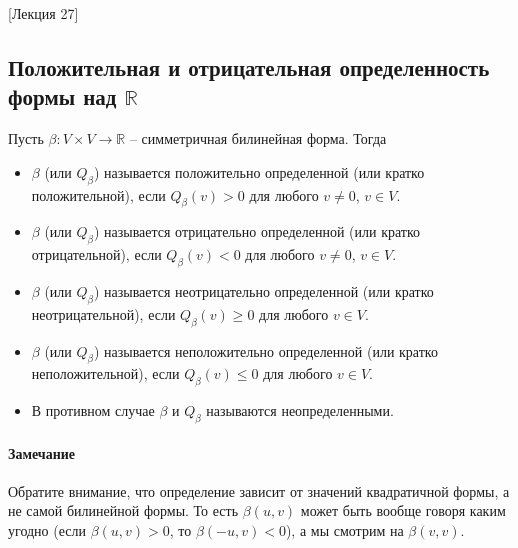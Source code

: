 [Лекция 27]


\subsection{Положительная и отрицательная определенность формы над $\mathbb R$}

\begin{definition}
Пусть $\beta\colon V\times V\to \mathbb R$ -- симметричная билинейная форма.
Тогда
\begin{itemize}
\item $\beta$ (или $Q_\beta$) называется положительно определенной (или кратко положительной), если $Q_\beta(v) > 0$ для любого $v\neq 0$, $v\in V$.

\item $\beta$ (или $Q_\beta$) называется отрицательно определенной (или кратко отрицательной), если $Q_\beta(v) < 0$ для любого $v\neq 0$, $v\in V$.

\item $\beta$ (или $Q_\beta$) называется неотрицательно определенной (или кратко неотрицательной), если $Q_\beta(v) \geqslant 0$ для любого $v\in V$.

\item $\beta$ (или $Q_\beta$) называется неположительно определенной (или кратко неположительной), если $Q_\beta(v) \leqslant 0$ для любого $v\in V$.

\item В противном случае $\beta$ и $Q_\beta$ называются неопределенными.
\end{itemize}
\end{definition}

\paragraph{Замечание}

Обратите внимание, что определение зависит от значений квадратичной формы, а не самой билинейной формы.
То есть $\beta(u,v)$ может быть вообще говоря каким угодно (если $\beta(u, v) >0$, то $\beta(-u, v)< 0$), а мы смотрим на $\beta(v, v)$.

